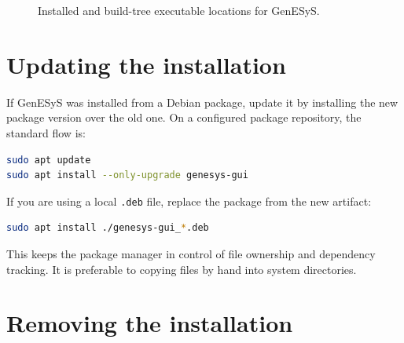 \begin{figure}[htbp]
    \centering



    \caption{Installed and build-tree executable locations for GenESyS.}
    \label{fig:user-executable-locations}
\end{figure}

\section{Updating the installation}
\label{sec:user-installation-updating}

If GenESyS was installed from a Debian package, update it by installing the new
package version over the old one. On a configured package repository, the
standard flow is:

\begin{lstlisting}[language=bash,caption={Updating an apt-based GenESyS installation},label={lst:user-installation-update}]
sudo apt update
sudo apt install --only-upgrade genesys-gui
\end{lstlisting}

If you are using a local \texttt{.deb} file, replace the package from the new
artifact:

\begin{lstlisting}[language=bash,caption={Replacing a local package artifact},label={lst:user-installation-update-local}]
sudo apt install ./genesys-gui_*.deb
\end{lstlisting}

This keeps the package manager in control of file ownership and dependency
tracking. It is preferable to copying files by hand into system directories.

\section{Removing the installation}
\label{sec:user-installation-removal}


